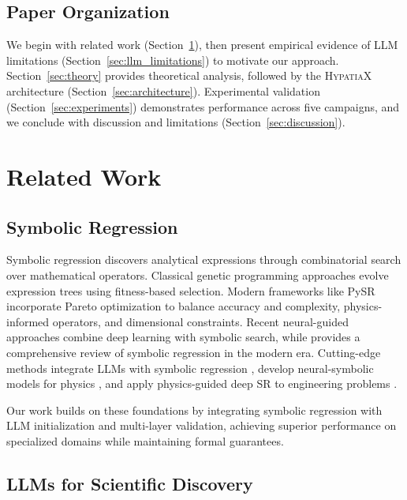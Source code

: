 \documentclass[twoside,11pt]{article}
\begin{document}
\subsection{Paper Organization}

We begin with related work (Section~\ref{sec:related}), then present empirical evidence of LLM limitations (Section~\ref{sec:llm_limitations}) to motivate our approach. Section~\ref{sec:theory} provides theoretical analysis, followed by the \textsc{HypatiaX} architecture (Section~\ref{sec:architecture}). Experimental validation (Section~\ref{sec:experiments}) demonstrates performance across five campaigns, and we conclude with discussion and limitations (Section~\ref{sec:discussion})\citep{kambhampati2024llms}.

\section{Related Work}
\label{sec:related}

\subsection{Symbolic Regression}\citep{la2021contemporary}

Symbolic regression discovers analytical expressions through combinatorial search over mathematical operators. Classical genetic programming approaches \citep{koza1992genetic,schmidt2009distilling} evolve expression trees using fitness-based selection. Modern frameworks like PySR \citep{cranmer2023interpretable} incorporate Pareto optimization to balance accuracy and complexity, physics-informed operators, and dimensional constraints. Recent neural-guided approaches \citep{petersen2021deep,udrescu2020aifeynman} combine deep learning with symbolic search, while \citet{cranmer2023symbolic} provides a comprehensive review of symbolic regression in the modern era. Cutting-edge methods integrate LLMs with symbolic regression \citep{taskin2026knowledge}, develop neural-symbolic models for physics \citep{ying2025physe2e}, and apply physics-guided deep SR to engineering problems \citep{zhang2026formula,senetakis2026symbolic}.

Our work builds on these foundations by integrating symbolic regression with LLM initialization and multi-layer validation, achieving superior performance on specialized domains while maintaining formal guarantees\citep{la2021contemporary}\citep{kambhampati2024llms}.

\subsection{LLMs for Scientific Discovery}\citep{koza1994genetic}\citep{virtanen2020scipy}\citep{kambhampati2024llms}
\end{document}
